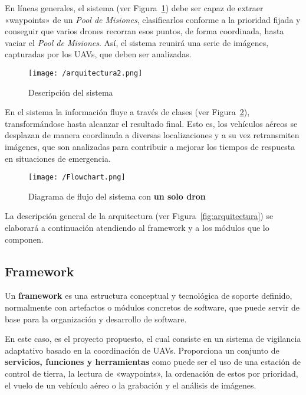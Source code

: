 En líneas generales, el sistema (ver Figura~\ref{fig:descripcion}) debe ser capaz de extraer «waypoints» de un \textit{Pool de Misiones}, clasificarlos conforme a la prioridad fijada y conseguir que varios drones recorran esos puntos, de forma coordinada, hasta vaciar el \textit{Pool de Misiones}. Así, el sistema reunirá una serie de imágenes, capturadas por los \acs{UAV}s, que deben ser analizadas.
 
\begin{figure}[!h]
\begin{center}
\texttt{[image: /arquitectura2.png]}
\caption[Descripción del sistema]{Descripción del sistema}
\label{fig:descripcion}
\end{center}
\end{figure}

En el sistema la información fluye a través de clases (ver Figura~\ref{fig:diagflujo}), transformándose hasta alcanzar el resultado final. Esto es, los vehículos aéreos se desplazan de manera coordinada a diversas localizaciones y a su vez retransmiten imágenes, que son analizadas para contribuir a mejorar los tiempos de respuesta en situaciones de emergencia.

\begin{figure}[!h]
\begin{center}
\texttt{[image: /Flowchart.png]}
\caption[Diagrama de flujo del sistema con un solo dron]{Diagrama de flujo del sistema con \textbf{un solo dron}}
\label{fig:diagflujo}
\end{center}
\end{figure}

La descripción general de la arquitectura (ver Figura~\ref{fig:arquitectura}) se elaborará a continuación atendiendo al framework y a los módulos que lo componen.

\clearpage

\subsection{Framework}
\label{sec:framework}

Un \textbf{framework} es una estructura conceptual y tecnológica de soporte definido, normalmente con artefactos o módulos concretos de software, que puede servir de base para la organización y desarrollo de software.

En este caso, es el proyecto propuesto, el cual consiste en un sistema de vigilancia adaptativo basado en la coordinación de \acs{UAV}s. Proporciona un conjunto de \textbf{servicios, funciones y herramientas} como puede ser el uso de una estación de control de tierra, la lectura de «waypoints», la ordenación de estos por prioridad, el vuelo de un vehículo aéreo o la grabación y el análisis de imágenes.


